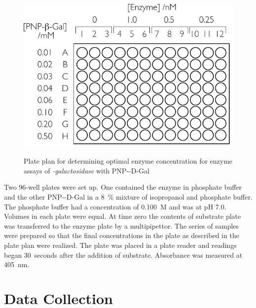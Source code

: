 \documentclass[]{tufte-handout}
\begin{document}
\begin{figure}[h!]

  \caption[0mm]{Plate plan for determining optimal enzyme concentration for enzyme assays of \emph{\textbeta -galactosidase} with PNP-\textbeta-D-Gal} 
  \vspace{2mm}
    \centering
  \includegraphics[scale=0.7]{Microtitreplateplan.pdf}
  \vspace{5mm}
  \label{fig:fig1}
\end{figure}

Two 96-well plates were set up. One contained the enzyme in phosphate buffer and the other PNP-\textbeta-D-Gal in a \qty{8}{\percent} mixture of isopropanol and phosphate buffer. The phosphate buffer had a concentration of \qty{0.100}{M} and was at pH 7.0. Volumes in each plate were equal. At time zero the contents of substrate plate was transferred to the enzyme plate by a multipipettor. The series of samples were prepared so that the final concentrations in the plate as described in the plate plan were realized. The plate was placed in a plate reader and readings began 30~seconds after the addition of substrate. Absorbance was measured at \qty{405}{nm}.

\section{Data Collection}
\end{document}
